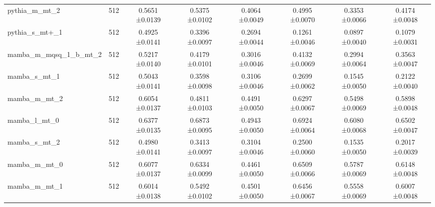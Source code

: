 \begin{tabular}{lccccccc}
pythia\_m\_mt\_2 & 512 & 0.5651 ±0.0139 & 0.5375 ±0.0102 & 0.4064 ±0.0049 & 0.4995 ±0.0070 & 0.3353 ±0.0066 & 0.4174 ±0.0048 \\
pythia\_s\_mt+\_1 & 512 & 0.4925 ±0.0141 & 0.3396 ±0.0097 & 0.2694 ±0.0044 & 0.1261 ±0.0046 & 0.0897 ±0.0040 & 0.1079 ±0.0031 \\
mamba\_m\_mqsq\_1\_b\_mt\_2 & 512 & 0.5217 ±0.0140 & 0.4179 ±0.0101 & 0.3016 ±0.0046 & 0.4132 ±0.0069 & 0.2994 ±0.0064 & 0.3563 ±0.0047 \\
mamba\_s\_mt\_1 & 512 & 0.5043 ±0.0141 & 0.3598 ±0.0098 & 0.3106 ±0.0046 & 0.2699 ±0.0062 & 0.1545 ±0.0050 & 0.2122 ±0.0040 \\
mamba\_m\_mt\_2 & 512 & 0.6054 ±0.0137 & 0.4811 ±0.0103 & 0.4491 ±0.0050 & 0.6297 ±0.0067 & 0.5498 ±0.0069 & 0.5898 ±0.0048 \\
mamba\_l\_mt\_0 & 512 & 0.6377 ±0.0135 & 0.6873 ±0.0095 & 0.4943 ±0.0050 & 0.6924 ±0.0064 & 0.6080 ±0.0068 & 0.6502 ±0.0047 \\
mamba\_s\_mt\_2 & 512 & 0.4980 ±0.0141 & 0.3413 ±0.0097 & 0.3104 ±0.0046 & 0.2500 ±0.0060 & 0.1535 ±0.0050 & 0.2017 ±0.0039 \\
mamba\_m\_mt\_0 & 512 & 0.6077 ±0.0137 & 0.6334 ±0.0099 & 0.4461 ±0.0050 & 0.6509 ±0.0066 & 0.5787 ±0.0069 & 0.6148 ±0.0048 \\
mamba\_m\_mt\_1 & 512 & 0.6014 ±0.0138 & 0.5492 ±0.0102 & 0.4501 ±0.0050 & 0.6456 ±0.0067 & 0.5558 ±0.0069 & 0.6007 ±0.0048 \\
\bottomrule
\end{tabular}
